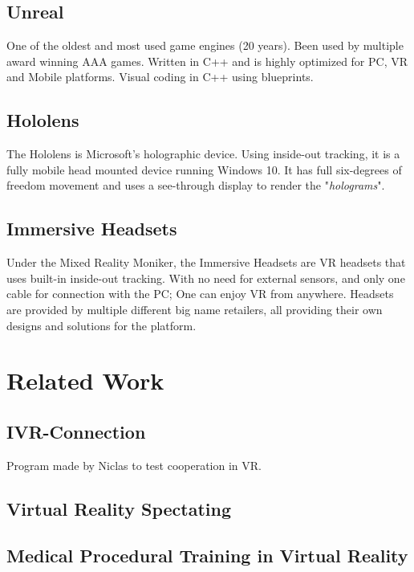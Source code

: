     \subsection{Unreal}
    One of the oldest and most used game engines (20 years). Been used by multiple award winning AAA games. Written in C++ and is highly optimized for PC, VR and Mobile platforms.
    Visual coding in C++ using blueprints.

    \subsection{Hololens}
    The Hololens is Microsoft's holographic device. Using inside-out tracking, it is a fully mobile head mounted device running Windows 10. It has full six-degrees of freedom movement and uses a see-through display to render the "\emph{holograms}".

    \subsection{Immersive Headsets}
    Under the Mixed Reality Moniker, the Immersive Headsets are VR headsets that uses built-in inside-out tracking. With no need for external sensors, and only one cable for connection with the PC; One can enjoy VR from anywhere. Headsets are provided by multiple different big name retailers, all providing their own designs and solutions for the platform.

\section{Related Work}
    
    \subsection{IVR-Connection}
    Program made by Niclas to test cooperation in VR.
    
    \subsection{Virtual Reality Spectating}
    
    \subsection{Medical Procedural Training in Virtual Reality}
